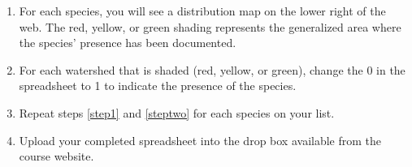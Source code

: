 \documentclass[12pt]{exam}
\begin{document}
\begin{enumerate}[resume]
\item \label{step1}
  For each species, you will see a distribution map on the 
  lower right of the web. The red, yellow, or
  green shading  
  represents the generalized area where the species' presence has 
  been documented.
\item \label{steptwo}
  For each watershed that is shaded (red, yellow, or green), change the 0 in the 
  spreadsheet to 1 to indicate the presence of the species.
\item
  Repeat steps \ref{step1} and \ref{steptwo} for each species on your list.
\item
  Upload your completed spreadsheet into the drop box available 
  from the course website.
\end{enumerate}
\newpage

\end{document}
